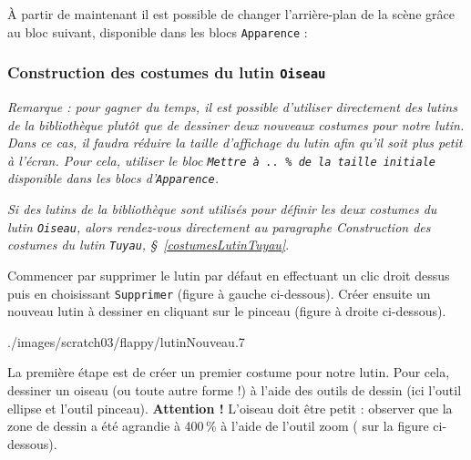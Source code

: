 


À partir de maintenant il est possible de changer l'arrière-plan de la scène grâce au bloc suivant, disponible dans les blocs \texttt{Apparence} :








\subsubsection{Construction des costumes du lutin \texttt{Oiseau}}

\emph{Remarque : pour gagner du temps, il est possible d'utiliser directement des lutins de la bibliothèque plutôt que de dessiner deux nouveaux costumes pour notre lutin. Dans ce cas, il faudra réduire la taille d'affichage du lutin afin qu'il soit plus petit à l'écran. Pour cela, utiliser le bloc \texttt{Mettre à ..\,\% de la taille initiale} disponible dans les blocs d'\texttt{Apparence}.}

\vspace{3pt}

\emph{Si des lutins de la bibliothèque sont utilisés pour définir les deux costumes du lutin \texttt{Oiseau}, alors rendez-vous directement au paragraphe \emph{Construction des costumes du lutin \texttt{Tuyau}}, \S\ \vref{costumesLutinTuyau}}.

\vspace{6pt}

Commencer par supprimer le lutin par défaut en effectuant un clic droit dessus puis en choisissant \texttt{Supprimer} (figure à gauche ci-dessous). Créer ensuite un nouveau lutin à dessiner en cliquant sur le pinceau (figure à droite ci-dessous).

%
	      {./images/scratch03/flappy/lutinNouveau}{.7\textwidth}

La première étape est de créer un premier costume pour notre lutin. Pour cela, dessiner un oiseau (ou toute autre forme !) à l'aide des outils de dessin (ici l'outil ellipse et l'outil pinceau). \textbf{Attention !} L'oiseau doit être petit : observer que la zone de dessin a été agrandie à 400\,\% à l'aide de l'outil zoom ( sur la figure ci-dessous).

